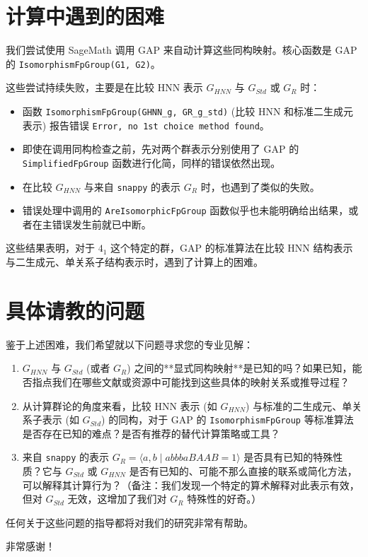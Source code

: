 \documentclass[12pt, a4paper]{article}
\begin{document}
\section{计算中遇到的困难}
我们尝试使用 SageMath 调用 GAP 来自动计算这些同构映射。核心函数是 GAP 的 \texttt{IsomorphismFpGroup(G1, G2)}。

这些尝试持续失败，主要是在比较 HNN 表示 $G_{HNN}$ 与 $G_{Std}$ 或 $G_R$ 时：
\begin{itemize}
    \item 函数 \texttt{IsomorphismFpGroup(GHNN\_g, GR\_g\_std)} (比较 HNN 和标准二生成元表示) 报告错误 \texttt{Error, no 1st choice method found}。
    \item 即使在调用同构检查之前，先对两个群表示分别使用了 GAP 的 \texttt{SimplifiedFpGroup} 函数进行化简，同样的错误依然出现。
    \item 在比较 $G_{HNN}$ 与来自 \texttt{snappy} 的表示 $G_R$ 时，也遇到了类似的失败。
    \item 错误处理中调用的 \texttt{AreIsomorphicFpGroup} 函数似乎也未能明确给出结果，或者在主错误发生前就已中断。
\end{itemize}
这些结果表明，对于 $4_1$ 这个特定的群，GAP 的标准算法在比较 HNN 结构表示与二生成元、单关系子结构表示时，遇到了计算上的困难。

\section{具体请教的问题}
鉴于上述困难，我们希望就以下问题寻求您的专业见解：
\begin{enumerate}
    \item $G_{HNN}$ 与 $G_{Std}$ (或者 $G_R$) 之间的**显式同构映射**是已知的吗？如果已知，能否指点我们在哪些文献或资源中可能找到这些具体的映射关系或推导过程？
    \item 从计算群论的角度来看，比较 HNN 表示 (如 $G_{HNN}$) 与标准的二生成元、单关系子表示 (如 $G_{Std}$) 的同构，对于 GAP 的 \texttt{IsomorphismFpGroup} 等标准算法是否存在已知的难点？是否有推荐的替代计算策略或工具？
    \item 来自 \texttt{snappy} 的表示 $G_R = \langle a, b \mid abbbaBAAB=1 \rangle$ 是否具有已知的特殊性质？它与 $G_{Std}$ 或 $G_{HNN}$ 是否有已知的、可能不那么直接的联系或简化方法，可以解释其计算行为？（备注：我们发现一个特定的算术解释对此表示有效，但对 $G_{Std}$ 无效，这增加了我们对 $G_R$ 特殊性的好奇。）
\end{enumerate}

任何关于这些问题的指导都将对我们的研究非常有帮助。

非常感谢！
\end{document}

